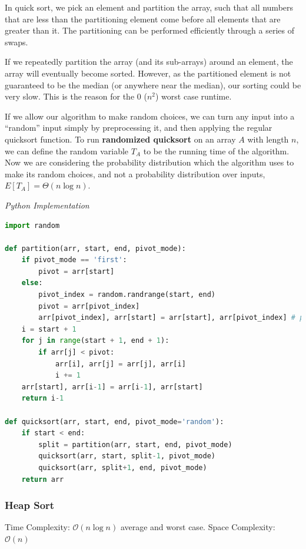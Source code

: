 \documentclass{article}
\newcommand{\bigO}{\mathcal{O}}
\begin{document}
     In quick sort, we pick an element and partition the array, such that all numbers that are less than the partitioning element come before all elements that are greater than it. The partitioning can be performed efficiently through a series of swaps.

    If we repeatedly partition the array (and its sub-arrays) around an element, the array will eventually become sorted. However, as the partitioned element is not guaranteed to be the median (or anywhere near the median), our sorting could be very slow. This is the reason for the 0 ($n^2$) worst case runtime.
    
    If we allow our algorithm to make random choices, we can turn any input into a ``random” input simply by preprocessing it, and then applying the regular quicksort function. To run \textbf{randomized quicksort} on an array $A$ with length $n$, we can define the random variable $T_A$ to be the running time of the algorithm. Now we are considering the probability distribution which the algorithm uses to make its random choices, and not a probability distribution over inputs, $E[T_A] = \Theta(n \log{n})$.
    
\vspace{8pt} \emph{Python Implementation}
\begin{lstlisting}[language=Python]
import random

def partition(arr, start, end, pivot_mode):
	if pivot_mode == 'first':
		pivot = arr[start]
	else:
		pivot_index = random.randrange(start, end)
		pivot = arr[pivot_index]
		arr[pivot_index], arr[start] = arr[start], arr[pivot_index] # place the pivot at the start
	i = start + 1
	for j in range(start + 1, end + 1):
		if arr[j] < pivot:
			arr[i], arr[j] = arr[j], arr[i]
			i += 1
	arr[start], arr[i-1] = arr[i-1], arr[start]
	return i-1

def quicksort(arr, start, end, pivot_mode='random'):
	if start < end:
		split = partition(arr, start, end, pivot_mode)
		quicksort(arr, start, split-1, pivot_mode)
		quicksort(arr, split+1, end, pivot_mode)
	return arr
\end{lstlisting}
    
    \subsubsection{Heap Sort}
    Time Complexity: $\bigO(n \log n)$ average and worst case. Space Complexity: $\bigO (n)$
    
\end{document}
